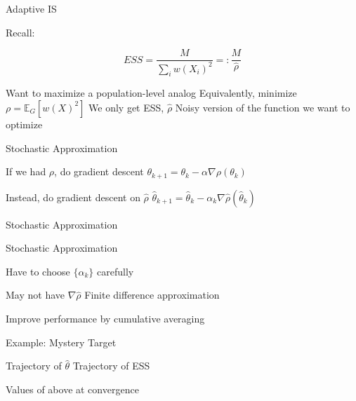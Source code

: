 \documentclass[14pt]{beamer}
\newcommand{\bE}{\mathbb{E}}
\begin{document}
\begin{frame}{Adaptive IS}
    \begin{outline}
        \1 Recall: 
    \end{outline}
    \begin{equation*}
        ESS = \frac{M}{\sum_i w(X_i)^2} =: \frac{M}{\hat{\rho}}
    \end{equation*}
    \begin{outline}
        \1 Want to maximize a population-level analog
            \2 Equivalently, minimize $\rho = \bE_G \left[ w(X)^2 \right]$ \newline
        \1 We only get ESS, $\hat{\rho}$
        \1 Noisy version of the function we want to optimize
    \end{outline}
\end{frame}

\begin{frame}{Stochastic Approximation}
    \begin{outline}
        \1 If we had $\rho$, do gradient descent
        \1 $\theta_{k+1} = \theta_k - \alpha \nabla \rho(\theta_k)$ \newline

        \1 Instead, do gradient descent on $\hat{\rho}$
        \1 $\hat{\theta}_{k+1} = \hat{\theta}_k - \alpha_k \nabla \hat{\rho}(\hat{\theta}_k)$ \newline

        \1 Stochastic Approximation
            \2 \citep{Rob51}
    \end{outline}
\end{frame}

\begin{frame}{Stochastic Approximation}
    \begin{outline}
        \1 Have to choose $\{ \alpha_k \}$ carefully \newline

        \1 May not have $\nabla \hat{\rho}$
            \2 Finite difference approximation
            \2 \citep{Kie52} \newline

        \1 Improve performance by cumulative averaging
    \end{outline}
\end{frame}



\begin{frame}{Example: Mystery Target}
    \begin{outline}
        \1 Trajectory of $\hat{\theta}$
        \1 Trajectory of ESS \newline

        \1 Values of above at convergence
    \end{outline}
\end{frame}
\end{document}
